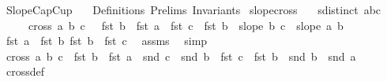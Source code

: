 %
\begin{isabellebody}%
%
%
\isadelimtheory
%
\endisadelimtheory
%
\isatagtheory
{}\isamarkupfalse%
\ SlopeCapCup\isanewline
\ \ \ Definitions\ Prelims\ Invariants\isanewline
\isanewline
{}%
\endisatagtheory
{\isafoldtheory}%
%
\isadelimtheory
\isanewline
%
\endisadelimtheory
\isanewline
\isanewline
\isanewline
{}\isamarkupfalse%
\ slope{\isacharunderscore}{\kern0pt}cross{}{\isacharcolon}{\kern0pt}\isanewline
\ \ \ {\isachardoublequoteopen}sdistinct\ {\isacharbrackleft}{\kern0pt}a{\isacharcomma}{\kern0pt}b{\isacharcomma}{\kern0pt}c{\isacharbrackright}{\kern0pt}{\isachardoublequoteclose}\isanewline
\ \ \ \ \ {\isachardoublequoteopen}cross{}\ a\ b\ c\ \ {\isacharequal}{\kern0pt}\ {\isacharparenleft}{\kern0pt}fst\ b\ {\isacharminus}{\kern0pt}\ fst\ a{\isacharparenright}{\kern0pt}\ {\isacharasterisk}{\kern0pt}\ {\isacharparenleft}{\kern0pt}fst\ c\ {\isacharminus}{\kern0pt}\ fst\ b{\isacharparenright}{\kern0pt}\ {\isacharasterisk}{\kern0pt}\ {\isacharparenleft}{\kern0pt}slope\ b\ c\ {\isacharminus}{\kern0pt}\ slope\ a\ b{\isacharparenright}{\kern0pt}{\isachardoublequoteclose}\isanewline
%
\isadelimproof
%
\endisadelimproof
%
\isatagproof
{}\isamarkupfalse%
{\isacharminus}{\kern0pt}\isanewline
\ \ \isamarkupfalse%
\ {}{\isacharcolon}{\kern0pt}{\isachardoublequoteopen}fst\ a\ {\isasymnoteq}\ fst\ b{\isachardoublequoteclose}\ {\isachardoublequoteopen}fst\ b\ {\isasymnoteq}\ fst\ c{\isachardoublequoteclose}\ \isamarkupfalse%
\ assms{\isacharparenleft}{\kern0pt}{}{\isacharparenright}{\kern0pt}\ \isamarkupfalse%
\ simp{\isacharplus}{\kern0pt}\isanewline
\ \ \isamarkupfalse%
\ {\isachardoublequoteopen}cross{}\ a\ b\ c\ {\isacharequal}{\kern0pt}\ {\isacharparenleft}{\kern0pt}fst\ b\ {\isacharminus}{\kern0pt}\ fst\ a{\isacharparenright}{\kern0pt}\ {\isacharasterisk}{\kern0pt}\ {\isacharparenleft}{\kern0pt}snd\ c\ {\isacharminus}{\kern0pt}\ snd\ b{\isacharparenright}{\kern0pt}\ {\isacharminus}{\kern0pt}\ {\isacharparenleft}{\kern0pt}fst\ c\ {\isacharminus}{\kern0pt}\ fst\ b{\isacharparenright}{\kern0pt}\ {\isacharasterisk}{\kern0pt}\ {\isacharparenleft}{\kern0pt}snd\ b\ {\isacharminus}{\kern0pt}\ snd\ a{\isacharparenright}{\kern0pt}{\isachardoublequoteclose}\ \isamarkupfalse%
\ cross{}{\isacharunderscore}{\kern0pt}def\ \isamarkupfalse%

\end{isabellebody}
